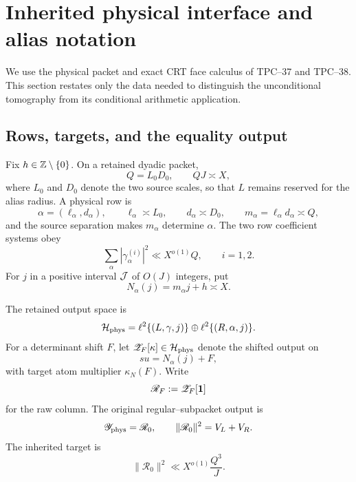 \section{Inherited physical interface and alias notation}
\label{sec:tpc39-interface}

We use the physical packet and exact CRT face calculus of TPC--37 and
TPC--38.  This section restates only the data needed to distinguish the
unconditional tomography from its conditional arithmetic application.

\subsection{Rows, targets, and the equality output}

Fix \(h\in\mathbb Z\setminus\{0\}\).  On a retained dyadic packet,
\begin{equation}
 Q=L_0D_0,
 \qquad QJ\asymp X,
 \label{eq:tpc39-interface-scales}
\end{equation}
where \(L_0\) and \(D_0\) denote the two source scales, so that \(L\) remains
reserved for the alias radius.  A physical row is
\begin{equation}
 \alpha=(\ell_\alpha,d_\alpha),
 \qquad
 \ell_\alpha\asymp L_0,
 \qquad
 d_\alpha\asymp D_0,
 \qquad
 m_\alpha=\ell_\alpha d_\alpha\asymp Q,
 \label{eq:tpc39-interface-row}
\end{equation}
and the source separation makes \(m_\alpha\) determine \(\alpha\).  The
two row coefficient systems obey
\begin{equation}
 \sum_\alpha|\gamma_\alpha^{(i)}|^2
 \ll X^{o(1)}Q,
 \qquad i=1,2.
 \label{eq:tpc39-interface-row-l2}
\end{equation}
For \(j\) in a positive interval \(\mathcal J\) of \(O(J)\) integers, put
\begin{equation}
 N_\alpha(j)=m_\alpha j+h\asymp X.
 \label{eq:tpc39-interface-target}
\end{equation}

The retained output space is
\begin{equation}
 \mathcal H_{\rm phys}
 =\ell^2\{(L,\gamma,j)\}
 \oplus\ell^2\{(R,\alpha,j)\}.
 \label{eq:tpc39-interface-Hphys}
\end{equation}
For a determinant shift \(F\), let
\(\mathscr Z_F[\kappa]\in\mathcal H_{\rm phys}\) denote the shifted output on
\begin{equation}
 su=N_\alpha(j)+F,
 \label{eq:tpc39-interface-shifted-fiber}
\end{equation}
with target atom multiplier \(\kappa_N(F)\).  Write
\begin{equation}
 \mathscr R_F:=\mathscr Z_F[\mathbf 1]
 \label{eq:tpc39-interface-raw-column}
\end{equation}
for the raw column.  The original regular--subpacket output is
\begin{equation}
 \mathscr Y_{\rm phys}=\mathscr R_0,
 \qquad
 \|\mathscr R_0\|^2=V_L+V_R.
 \label{eq:tpc39-interface-physical-gate}
\end{equation}
The inherited target is
\begin{equation}
 \boxed{
 \|\mathscr R_0\|^2
 \ll X^{o(1)}\frac{Q^3}{J}.}
 \label{eq:tpc39-interface-target-gate}
\end{equation}

